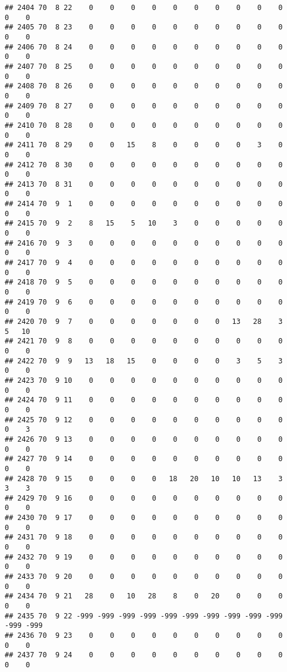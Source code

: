 \documentclass[]{article}
\begin{document}
\begin{verbatim}
## 2404 70  8 22    0    0    0    0    0    0    0    0    0    0    0    0
## 2405 70  8 23    0    0    0    0    0    0    0    0    0    0    0    0
## 2406 70  8 24    0    0    0    0    0    0    0    0    0    0    0    0
## 2407 70  8 25    0    0    0    0    0    0    0    0    0    0    0    0
## 2408 70  8 26    0    0    0    0    0    0    0    0    0    0    0    0
## 2409 70  8 27    0    0    0    0    0    0    0    0    0    0    0    0
## 2410 70  8 28    0    0    0    0    0    0    0    0    0    0    0    0
## 2411 70  8 29    0    0   15    8    0    0    0    0    3    0    0    0
## 2412 70  8 30    0    0    0    0    0    0    0    0    0    0    0    0
## 2413 70  8 31    0    0    0    0    0    0    0    0    0    0    0    0
## 2414 70  9  1    0    0    0    0    0    0    0    0    0    0    0    0
## 2415 70  9  2    8   15    5   10    3    0    0    0    0    0    0    0
## 2416 70  9  3    0    0    0    0    0    0    0    0    0    0    0    0
## 2417 70  9  4    0    0    0    0    0    0    0    0    0    0    0    0
## 2418 70  9  5    0    0    0    0    0    0    0    0    0    0    0    0
## 2419 70  9  6    0    0    0    0    0    0    0    0    0    0    0    0
## 2420 70  9  7    0    0    0    0    0    0    0   13   28    3    5   10
## 2421 70  9  8    0    0    0    0    0    0    0    0    0    0    0    0
## 2422 70  9  9   13   18   15    0    0    0    0    3    5    3    0    0
## 2423 70  9 10    0    0    0    0    0    0    0    0    0    0    0    0
## 2424 70  9 11    0    0    0    0    0    0    0    0    0    0    0    0
## 2425 70  9 12    0    0    0    0    0    0    0    0    0    0    0    3
## 2426 70  9 13    0    0    0    0    0    0    0    0    0    0    0    0
## 2427 70  9 14    0    0    0    0    0    0    0    0    0    0    0    0
## 2428 70  9 15    0    0    0    0   18   20   10   10   13    3    3    3
## 2429 70  9 16    0    0    0    0    0    0    0    0    0    0    0    0
## 2430 70  9 17    0    0    0    0    0    0    0    0    0    0    0    0
## 2431 70  9 18    0    0    0    0    0    0    0    0    0    0    0    0
## 2432 70  9 19    0    0    0    0    0    0    0    0    0    0    0    0
## 2433 70  9 20    0    0    0    0    0    0    0    0    0    0    0    0
## 2434 70  9 21   28    0   10   28    8    0   20    0    0    0    0    0
## 2435 70  9 22 -999 -999 -999 -999 -999 -999 -999 -999 -999 -999 -999 -999
## 2436 70  9 23    0    0    0    0    0    0    0    0    0    0    0    0
## 2437 70  9 24    0    0    0    0    0    0    0    0    0    0    0    0

\end{verbatim}
\end{document}
